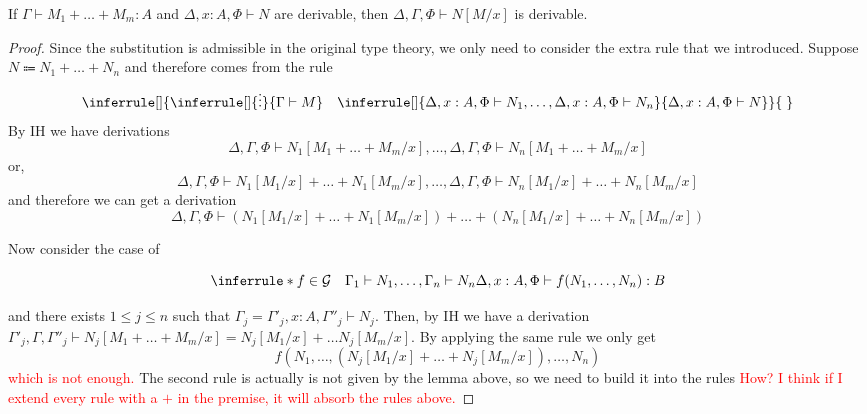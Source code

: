 \documentclass[acmsmall,screen, nonacm, anonymous]{acmart}
\begin{document}
\begin{lemma}
  If $\Gamma \vdash M_1 + \ldots + M_m : A$ and $\Delta, x : A, \Phi \vdash N$ are derivable, then $\Delta, \Gamma, \Phi \vdash N[M/x]$ is derivable.
\end{lemma}
\begin{proof}
  Since the substitution is admissible in the original type theory, we only need to consider the extra rule that we introduced.
  Suppose $N \Coloneqq N_1 + \ldots + N_n$ and therefore comes from the rule
  \[
  \inferrule[]{\inferrule[]{\vdots}{\Gamma \vdash M} \quad \inferrule[]{\Delta, x : A, \Phi \vdash N_1, \ldots, \Delta, x : A, \Phi \vdash N_n}{\Delta, x : A, \Phi \vdash N}}{\;}
  \]
  By IH we have derivations
  \[
    \Delta, \Gamma, \Phi \vdash N_1[M_1 + \ldots + M_m /x], \ldots, \Delta, \Gamma, \Phi \vdash N_n[M_1 + \ldots + M_m /x]
  \]
  or,
  \[
    \Delta, \Gamma, \Phi \vdash N_1[M_1/ x] + \ldots + N_1[M_m /x], \ldots, \Delta, \Gamma, \Phi \vdash N_n[M_1 / x] + \ldots + N_n[M_m /x]
  \]
  and therefore we can get a derivation 
  \[
  \Delta, \Gamma, \Phi \vdash (N_1[M_1/ x] + \ldots + N_1[M_m /x]) + \ldots + (N_n[M_1/ x] + \ldots + N_n[M_m /x])
  \]

  Now consider the case of

  \[
  \inferrule*{f \in \mathcal{G} \quad \Gamma_1 \vdash N_1, \ldots, \Gamma_n \vdash N_n}{\Delta , x : A, \Phi \vdash f(N_1, \ldots, N_n) : B}
  \]

  and there exists $1 \leq j \leq n$ such that $\Gamma_j = \Gamma'_j, x : A, \Gamma''_j \vdash N_j$.
  Then, by IH we have a derivation $\Gamma'_j,\Gamma,\Gamma''_j \vdash N_j[M_1 + \ldots + M_m / x] = N_j[M_1 / x] + \ldots N_j[M_m / x]$.
  By applying the same rule we only get 
  \[
  f(N_1, \ldots, (N_j[M_1/x] + \ldots + N_j[M_m / x]), \ldots, N_n)
  \]
  \textcolor{red}{which is not enough.}
  The second rule is actually is not given by the lemma above, so we need to build it into the rules \textcolor{red}{How? I think if I extend every rule with a $+$ in the premise, it will absorb the rules above.}
\end{proof}
\end{document}
